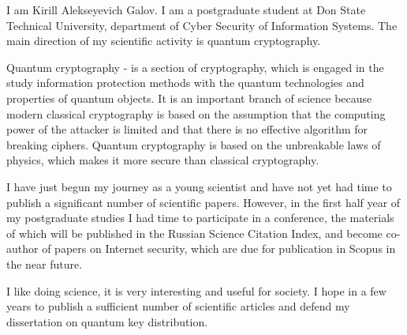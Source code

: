 
I am Kirill Alekseyevich Galov. I am a postgraduate student at Don State Technical University, department of Cyber Security of Information Systems. The main direction of my scientific activity is quantum cryptography.

Quantum cryptography - is a section of cryptography, which is engaged in the study information protection methods with the quantum technologies and properties of quantum objects. It is an important branch of science because modern classical cryptography is based on the assumption that the computing power of the attacker is limited and that there is no effective algorithm for breaking ciphers. Quantum cryptography is based on the unbreakable laws of physics, which makes it more secure than classical cryptography.

I have just begun my journey as a young scientist and have not yet had time to publish a significant number of scientific papers. However, in the first half year of my postgraduate studies I had time to participate in a conference, the materials of which will be published in the Russian Science Citation Index, and become co-author of papers on Internet security, which are due for publication in Scopus in the near future.

I like doing science, it is very interesting and useful for society. I hope in a few years to publish a sufficient number of scientific articles and defend my dissertation on quantum key distribution.


\clearpage

